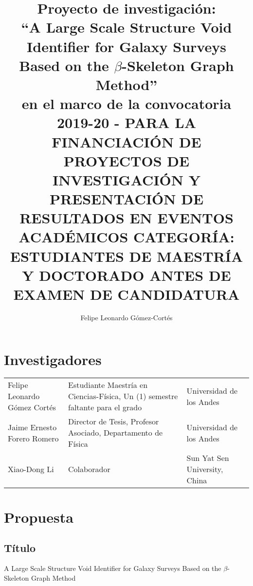 \documentclass[manuscript]{aastex62}
\begin{document}
\title{Proyecto de investigación:\\``A Large Scale Structure Void Identifier for Galaxy Surveys
  Based on the $\beta$-Skeleton Graph Method'' \\en el marco de la convocatoria\\
  2019-20 - PARA LA FINANCIACIÓN DE PROYECTOS DE INVESTIGACIÓN Y PRESENTACIÓN DE
  RESULTADOS EN EVENTOS ACADÉMICOS CATEGORÍA: ESTUDIANTES DE MAESTRÍA Y
  DOCTORADO ANTES DE EXAMEN DE CANDIDATURA}

  

\author{Felipe Leonardo Gómez-Cortés}



\section{Investigadores}

\begin{centering}
\begin{table}[h]
\begin{tabular}{lp{6.5cm}p{5cm}}
\hline
\hline
Felipe Leonardo Gómez Cortés & Estudiante Maestría en Ciencias-Física, Un (1) semestre faltante para el grado & Universidad de los Andes      \\
Jaime Ernesto Forero Romero  & Director de Tesis, Profesor Asociado, Departamento de Física & Universidad de los Andes      \\ 
Xiao-Dong Li                 & Colaborador                                                  & Sun Yat Sen University, China \\ \hline \hline
\end{tabular}
\end{table}
\end{centering}

\section{Propuesta}

\subsection{Título}
A Large Scale Structure Void Identifier for Galaxy Surveys Based on the $\beta$-Skeleton Graph Method
\end{document}
